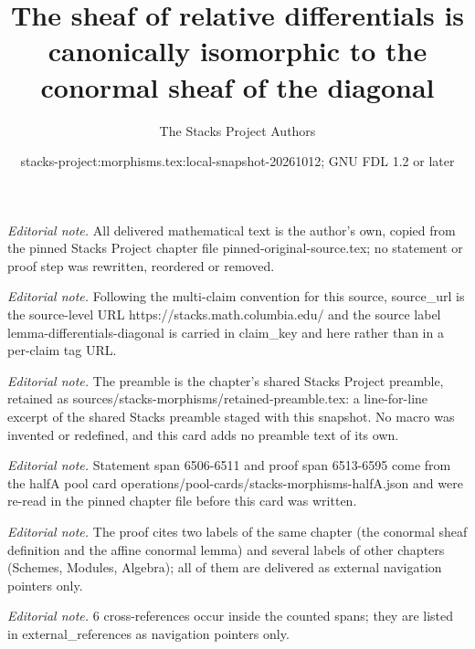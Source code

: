 \documentclass[10pt,a4paper]{amsart}
\title{The sheaf of relative differentials is canonically isomorphic to the conormal sheaf of the diagonal}
\author{The Stacks Project Authors}
\date{stacks-project:morphisms.tex:local-snapshot-20261012; GNU FDL 1.2 or later}
\theoremstyle{plain}
\theoremstyle{definition}
\theoremstyle{remark}
\numberwithin{equation}{subsection}
\begin{document}
\maketitle
\noindent\textit{Editorial note.} All delivered mathematical text is the author's own, copied from the pinned Stacks Project chapter file pinned-original-source.tex; no statement or proof step was rewritten, reordered or removed.\par\medskip
\noindent\textit{Editorial note.} Following the multi-claim convention for this source, source\_url is the source-level URL https://stacks.math.columbia.edu/ and the source label lemma-differentials-diagonal is carried in claim\_key and here rather than in a per-claim tag URL.\par\medskip
\noindent\textit{Editorial note.} The preamble is the chapter's shared Stacks Project preamble, retained as sources/stacks-morphisms/retained-preamble.tex: a line-for-line excerpt of the shared Stacks preamble staged with this snapshot. No macro was invented or redefined, and this card adds no preamble text of its own.\par\medskip
\noindent\textit{Editorial note.} Statement span 6506-6511 and proof span 6513-6595 come from the halfA pool card operations/pool-cards/stacks-morphisms-halfA.json and were re-read in the pinned chapter file before this card was written.\par\medskip
\noindent\textit{Editorial note.} The proof cites two labels of the same chapter (the conormal sheaf definition and the affine conormal lemma) and several labels of other chapters (Schemes, Modules, Algebra); all of them are delivered as external navigation pointers only.\par\medskip
\noindent\textit{Editorial note.} 6 cross-references occur inside the counted spans; they are listed in external\_references as navigation pointers only.\par\medskip
\end{document}
